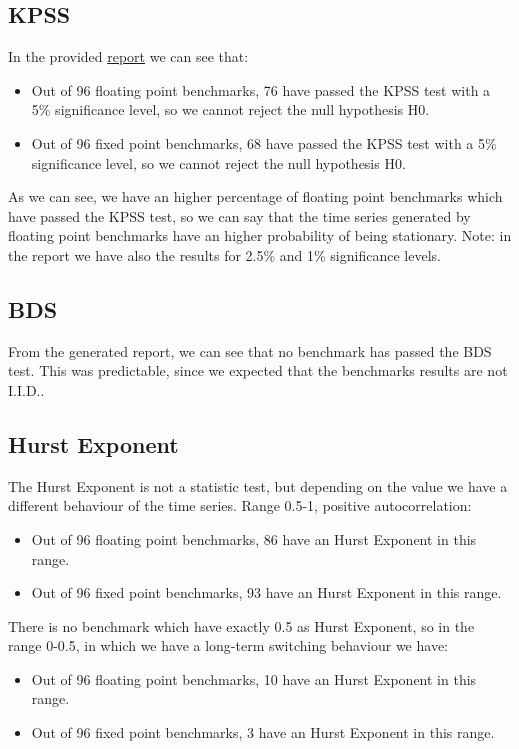 \subsection{KPSS}
In the provided \href{../statistics/tests\_results.txt}{report} we can see that:
\begin{itemize}
	\item Out of 96 floating point benchmarks, 76 have passed the KPSS test with a 5\% significance level, so we cannot reject the null hypothesis H0.
	\item Out of 96 fixed point benchmarks, 68 have passed the KPSS test with a 5\% significance level, so we cannot reject the null hypothesis H0.
\end{itemize}
As we can see, we have an higher percentage of floating point benchmarks which have passed the KPSS test, so we can say that the time series generated by floating point benchmarks have an higher probability of being stationary.\newline
Note: in the report we have also the results for 2.5\% and 1\% significance levels.

\subsection{BDS}
From the generated report, we can see that no benchmark has passed the BDS test. This was predictable, since we expected that the benchmarks results are not I.I.D..

\subsection{Hurst Exponent}
The Hurst Exponent is not a statistic test, but depending on the value we have a different behaviour of the time series.\newline
Range 0.5-1, positive autocorrelation:
\begin{itemize}
	\item Out of 96 floating point benchmarks, 86 have an Hurst Exponent in this range.
	\item Out of 96 fixed point benchmarks, 93 have an Hurst Exponent in this range.
\end{itemize}
There is no benchmark which have exactly 0.5 as Hurst Exponent, so in the range 0-0.5, in which we have a long-term switching behaviour we have:
\begin{itemize}
	\item Out of 96 floating point benchmarks, 10 have an Hurst Exponent in this range.
	\item Out of 96 fixed point benchmarks, 3 have an Hurst Exponent in this range.
\end{itemize}

